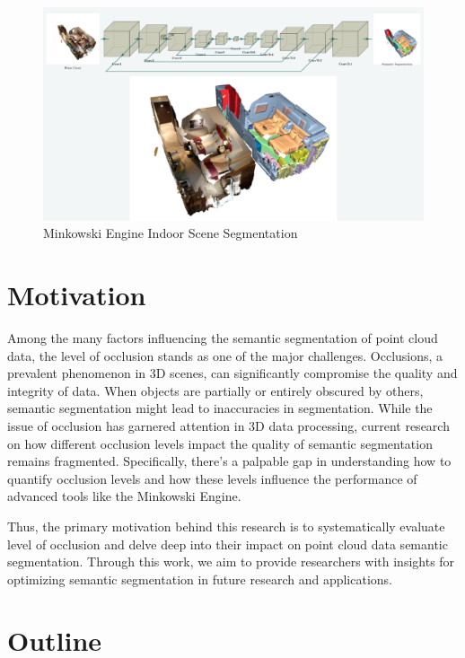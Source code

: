 \documentclass[11pt, a4paper,oneside,chapterprefix=false]{scrbook}
\begin{document}
\begin{figure}[h]
    \centering
    \includegraphics*[width=1.0\textwidth]{figures/Minkowski Engine.png}
    \caption{Minkowski Engine Indoor Scene Segmentation}
    \label{fig:minkowski}
\end{figure}


\section{Motivation} \label{sec:motivation}

Among the many factors influencing the semantic segmentation of point cloud data, the level of occlusion stands as one of the major 
challenges. Occlusions, a prevalent phenomenon in 3D scenes, can significantly compromise the quality and integrity of data. When objects are partially or entirely obscured by others, semantic segmentation might lead to inaccuracies in segmentation. While the issue of occlusion has garnered attention in 3D data processing, current research on how different occlusion levels impact the quality of semantic segmentation remains fragmented. Specifically, there's a palpable gap in understanding how to quantify occlusion levels and how these levels influence the performance of advanced tools like the Minkowski Engine. 

\vspace{10pt}

Thus, the primary motivation behind this research is to systematically evaluate level of occlusion and delve deep into their impact on point cloud data semantic segmentation. Through this work, we aim to provide researchers with insights for optimizing semantic segmentation in future research and applications.

\section{Outline} \label{sec:outline}
\end{document}
